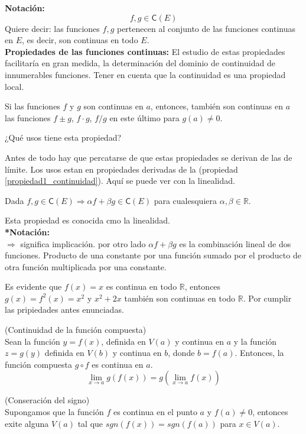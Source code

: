 \documentclass[10pt,twoside]{SelfArx} %
\begin{document}
\textbf{Notación:}
\[ f,g\in\textsf{C}(E) \]
Quiere decir: las funciones $ f, g $ pertenecen al conjunto de las funciones continuas en $ E $, es decir, son continuas en todo $ E $.\\

\textbf{Propiedades de las funciones continuas:}
El estudio de estas propiedades facilitar\'ia en gran medida, la determinación del dominio de continuidad de innumerables funciones. Tener en cuenta que la continuidad es una propiedad local.
\begin{propiedad}\label{propiedad1_continuidad}
	Si las funciones $ f $ y $ g $ son continuas en $ a $, entonces, también son continuas en $ a  $ las funciones $ f\pm g $, $ f\cdot g $, $ f/g $ en este último para $ g(a)\neq0 $.
\end{propiedad}
\begin{center}
	¿Qué usos tiene esta propiedad?
\end{center}
Antes de todo hay que percatarse de que estas propiedades se derivan de las de límite. Los usos estan en propiedades derivadas de la (propiedad \ref{propiedad1_continuidad}). Aquí se puede ver con la linealidad.
\begin{propiedad}\label{linealidad_propiedad}
	Dada $ f,g\in\textsf{C}(E)\Rightarrow\alpha f+\beta g \in\textsf{C}(E) $ para cualesquiera $ \alpha, \beta\in\mathbb{R} $.
\end{propiedad}
Esta propiedad es conocida cmo la linealidad.\\
\textbf{*Notación:}\\
$ \Rightarrow $ significa implicación. por otro lado $ \alpha f+\beta g $ es la combinaci\'on lineal de dos funciones. Producto de una constante por una función sumado por el producto de otra función multiplicada por una constante.\\
\begin{ejemplo}
	Es evidente que $ f(x)=x $ es continua en todo $ \mathbb{R} $, entonces $ g(x)=f^{2}(x)=x^{2} $ y $ x^{2}+2x $ tambi\'en son continuas en todo $ \mathbb{R} $. Por cumplir las pripiedades antes enunciadas.\\
\end{ejemplo}

\begin{propiedad}
	(Continuidad de la función compuesta)\\
	Sean la función $ y=f(x) $, definida en $ V(a) $ y continua en $ a $ y la función $ z=g(y) $ definida en $ V(b) $ y continua en $ b $, donde $ b=f(a) $. Entonces, la función compuesta $ g\circ f $ es continua en $ a $.
	 \begin{equation}
	\lim\limits_{x\rightarrow a}g(f(x))=g\left  (\lim\limits_{x\rightarrow a}f(x)\right  )
	\end{equation} 
	
\end{propiedad}
\begin{propiedad}
	(Conseración del signo)\\
	Supongamos que la función $ f $ es continua en el punto $ a $ y $ f(a)\neq0 $, entonces exite alguna $ V(a) $ tal que $ sgn(f(x))=sgn(f(a)) $ para $ x\in V(a) $.
\end{propiedad}
\end{document}
